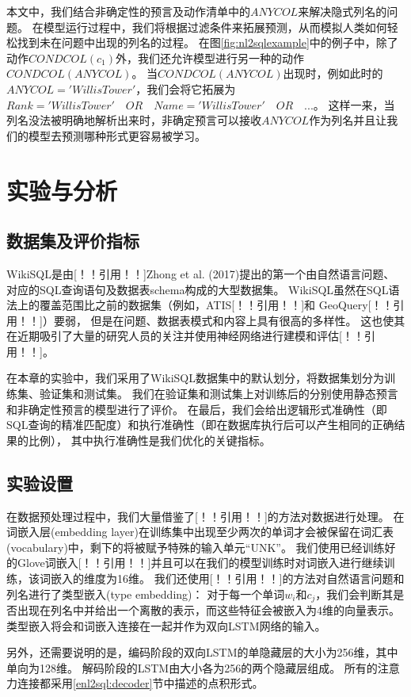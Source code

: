 本文中，我们结合非确定性的预言及动作清单中的$ANYCOL$来解决隐式列名的问题。
在模型运行过程中，我们将根据过滤条件来拓展预测，从而模拟人类如何轻松找到未在问题中出现的列名的过程。
在图\ref{fig:nl2sqlexample}中的例子中，除了动作$CONDCOL(c_1)$外，我们还允许模型进行另一种的动作$CONDCOL(ANYCOL)$。
当$CONDCOL(ANYCOL)$出现时，例如此时的$ANYCOL='Willis Tower'$，我们会将它拓展为$Rank='Willis Tower' \quad OR \quad Name='Willis Tower' \quad OR \quad ...$。
这样一来，当列名没法被明确地解析出来时，非确定预言可以接收$ANYCOL$作为列名并且让我们的模型去预测哪种形式更容易被学习。


\section{实验与分析}
\subsection{数据集及评价指标}
WikiSQL是由[！！引用！！]Zhong et al. (2017)提出的第一个由自然语言问题、对应的SQL查询语句及数据表schema构成的大型数据集。
WikiSQL虽然在SQL语法上的覆盖范围比之前的数据集（例如，ATIS[！！引用！！]和 GeoQuery[！！引用！！]）要弱，
但是在问题、数据表模式和内容上具有很高的多样性。
这也使其在近期吸引了大量的研究人员的关注并使用神经网络进行建模和评估[！！引用！！]。

在本章的实验中，我们采用了WikiSQL数据集中的默认划分，将数据集划分为训练集、验证集和测试集。
我们在验证集和测试集上对训练后的分别使用静态预言和非确定性预言的模型进行了评价。
在最后，我们会给出逻辑形式准确性（即SQL查询的精准匹配度）和执行准确性（即在数据库执行后可以产生相同的正确结果的比例），
其中执行准确性是我们优化的关键指标。


\subsection{实验设置}
在数据预处理过程中，我们大量借鉴了[！！引用！！]的方法对数据进行处理。
在词嵌入层(embedding layer)在训练集中出现至少两次的单词才会被保留在词汇表(vocabulary)中，剩下的将被赋予特殊的输入单元“UNK”。
我们使用已经训练好的Glove词嵌入[！！引用！！]并且可以在我们的模型训练时对词嵌入进行继续训练，该词嵌入的维度为16维。
我们还使用[！！引用！！]的方法对自然语言问题和列名进行了类型嵌入(type embedding)：
对于每一个单词$w_i$和$c_j$，我们会判断其是否出现在列名中并给出一个离散的表示，而这些特征会被嵌入为4维的向量表示。
类型嵌入将会和词嵌入连接在一起并作为双向LSTM网络的输入。

另外，还需要说明的是，编码阶段的双向LSTM的单隐藏层的大小为256维，其中单向为128维。
解码阶段的LSTM由大小各为256的两个隐藏层组成。
所有的注意力连接都采用\ref{enl2sql:decoder}节中描述的点积形式。

